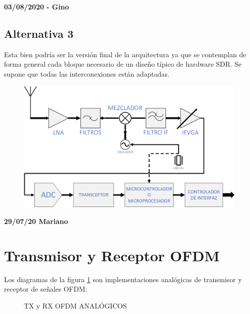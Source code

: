 \documentclass[a4paper,12pt]{report} %
\begin{document}
\textbf{03/08/2020 - Gino}
\subsection{Alternativa 3}

Esta bien podría ser la versión final de la arquitectura ya que se contemplan de forma general cada bloque necesario de un diseño típico de hardware SDR. Se supone que todas las interconexiones están adaptadas.

\begin{figure}[H]
	\centering
	\includegraphics[scale=0.6]{Imagenes/Arquitectura/diagrama3}
\end{figure}

\textbf{29/07/20 Mariano}
\section{Transmisor y Receptor OFDM \cite{tesis}}

Los diagramas de la figura \ref{txrx} son implementaciones analógicas de transmisor y receptor de señales OFDM:

\begin{figure}[H]
	\centering
	\caption{TX y RX OFDM ANALÓGICOS}
	\label{txrx}
\end{figure}
\end{document}
